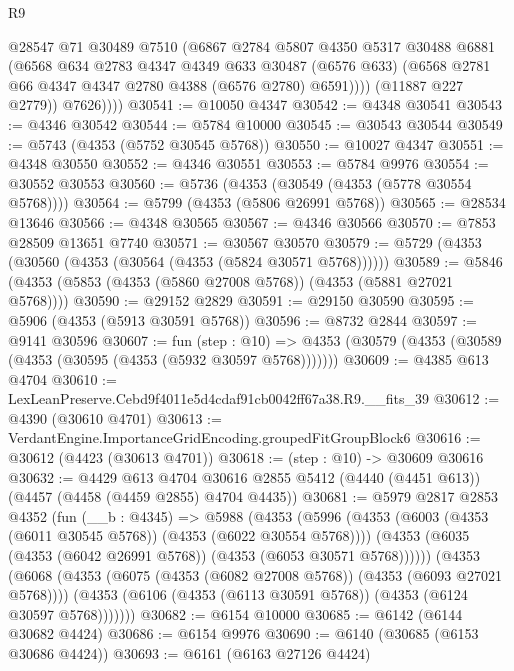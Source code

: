 \begin{lexlean}{R9}
\begin{coremodule}
                @28547
                @71
                @30489
                @7510
                (@6867
                  @2784
                  @5807
                  @4350
                  @5317
                  @30488
                  @6881
                  (@6568
                    @634
                    @2783
                    @4347
                    @4349
                    @633
                    @30487
                    (@6576 @633)
                    (@6568 @2781 @66 @4347 @4347 @2780 @4388 (@6576 @2780) @6591))))
              (@11887 @227 @2779))
            @7626))))
@30541 := @10050 @4347
@30542 := @4348 @30541
@30543 := @4346 @30542
@30544 := @5784 @10000
@30545 := @30543 @30544
@30549 := @5743 (@4353 (@5752 @30545 @5768))
@30550 := @10027 @4347
@30551 := @4348 @30550
@30552 := @4346 @30551
@30553 := @5784 @9976
@30554 := @30552 @30553
@30560 := @5736 (@4353 (@30549 (@4353 (@5778 @30554 @5768))))
@30564 := @5799 (@4353 (@5806 @26991 @5768))
@30565 := @28534 @13646
@30566 := @4348 @30565
@30567 := @4346 @30566
@30570 := @7853 @28509 @13651 @7740
@30571 := @30567 @30570
@30579 := @5729 (@4353 (@30560 (@4353 (@30564 (@4353 (@5824 @30571 @5768))))))
@30589 := @5846 (@4353 (@5853 (@4353 (@5860 @27008 @5768)) (@4353 (@5881 @27021 @5768))))
@30590 := @29152 @2829
@30591 := @29150 @30590
@30595 := @5906 (@4353 (@5913 @30591 @5768))
@30596 := @8732 @2844
@30597 := @9141 @30596
@30607 := fun (step : @10) =>
  @4353 (@30579 (@4353 (@30589 (@4353 (@30595 (@4353 (@5932 @30597 @5768)))))))
@30609 := @4385 @613 @4704
@30610 := LexLeanPreserve.Cebd9f4011e5d4cdaf91cb0042ff67a38.R9.__fits_39
@30612 := @4390 (@30610 @4701)
@30613 := VerdantEngine.ImportanceGridEncoding.groupedFitGroupBlock6
@30616 := @30612 (@4423 (@30613 @4701))
@30618 := (step : @10) -> @30609 @30616
@30632 := @4429
    @613
    @4704
    @30616
    @2855
    @5412
    (@4440 (@4451 @613))
    (@4457 (@4458 (@4459 @2855) @4704 @4435))
@30681 := @5979
    @2817
    @2853
    @4352
    (fun (__b : @4345) =>
    @5988
      (@4353
        (@5996
          (@4353 (@6003 (@4353 (@6011 @30545 @5768)) (@4353 (@6022 @30554 @5768))))
          (@4353 (@6035 (@4353 (@6042 @26991 @5768)) (@4353 (@6053 @30571 @5768))))))
      (@4353
        (@6068
          (@4353 (@6075 (@4353 (@6082 @27008 @5768)) (@4353 (@6093 @27021 @5768))))
          (@4353 (@6106 (@4353 (@6113 @30591 @5768)) (@4353 (@6124 @30597 @5768)))))))
@30682 := @6154 @10000
@30685 := @6142 (@6144 @30682 @4424)
@30686 := @6154 @9976
@30690 := @6140 (@30685 (@6153 @30686 @4424))
@30693 := @6161 (@6163 @27126 @4424)

\end{coremodule}
\end{lexlean}
